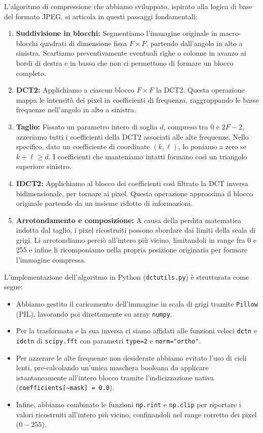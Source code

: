\documentclass[11pt,a4paper]{article}
\makeatletter
\let\@origtexttt\texttt
\renewcommand{\texttt}[1]{{\def\_{\textunderscore\discretionary{}{}{}}\@origtexttt{#1}}}
\makeatother
\begin{document}
L'algoritmo di compressione che abbiamo sviluppato, ispirato alla logica di base del formato JPEG, si articola in questi passaggi fondamentali:
\begin{enumerate}
    \item \textbf{Suddivisione in blocchi:} Segmentiamo l'immagine originale in macro-blocchi quadrati di dimensione fissa $F \times F$, partendo dall'angolo 
    in alto a sinistra. Scartiamo preventivamente eventuali righe o colonne in avanzo ai bordi di destra e in basso che non ci permettono di formare un blocco 
    completo.
    \item \textbf{DCT2:} Applichiamo a ciascun blocco $F \times F$ la DCT2.
    Questa operazione mappa le intensità dei pixel in coefficienti di frequenza, raggruppando le basse frequenze nell'angolo in alto a sinistra.
    \item \textbf{Taglio:} Fissato un parametro intero di soglia $d$, compreso tra $0$ e $2F-2$, azzeriamo 
    tutti i coefficienti della DCT2 associati alle alte frequenze. Nello specifico, dato un coefficiente di coordinate $(k, \ell)$, lo poniamo a zero se 
    $k + \ell \ge d$. I coefficienti che manteniamo intatti formano così un triangolo superiore sinistro.
    \item \textbf{IDCT2:} Applichiamo al blocco dei coefficienti così filtrato la DCT inversa bidimensionale, per tornare ai pixel. 
    Questa operazione approssima il blocco originale partendo da un insieme ridotto di informazioni.
    \item \textbf{Arrotondamento e composizione:} A causa della perdita matematica indotta dal taglio, i pixel ricostruiti possono sbordare dai limiti della scala 
    di grigi. Li arrotondiamo perciò all'intero più vicino, limitandoli in range fra 0 e 255 e infine li ricomponiamo nella propria posizione originaria per formare l'immagine compressa.
\end{enumerate}
L'implementazione dell'algoritmo in Python (\texttt{dct\_utils.py}) è strutturata come segue:
\begin{itemize}
      \item Abbiamo gestito il caricamento dell'immagine in scala di grigi tramite \texttt{Pillow} (PIL), lavorando poi direttamente su array \texttt{numpy}.
      \item Per la trasformata e la sua inversa ci siamo affidati alle funzioni veloci \texttt{dctn} e \texttt{idctn} di \texttt{scipy.fft} con parametri \texttt{type=2} e \texttt{norm="ortho"}.    
      \item Per azzerare le alte frequenze non desiderate abbiamo evitato l'uso di cicli lenti, pre-calcolando un'unica maschera booleana da applicare istantaneamente all'intero blocco tramite l'indicizzazione nativa (\texttt{coefficients[\textasciitilde mask] = 0.0}).
      \item Infine, abbiamo combinato le funzioni \texttt{np.rint} e \texttt{np.clip} per riportare i valori ricostruiti all'intero più vicino, confinandoli nel range corretto dei pixel ($0-255$).
\end{itemize}
\end{document}
